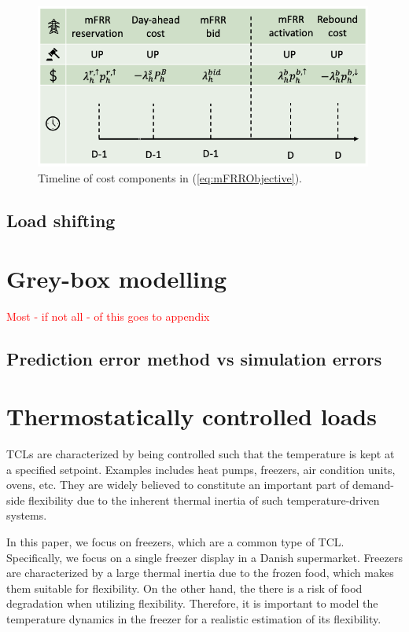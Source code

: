 \documentclass[11pt,a4paper]{article}
\begin{document}
\begin{figure}[H]
    \centering
    \includegraphics[width=0.99\textwidth]{figures/timeline_mfrr.png}
    \caption{Timeline of cost components in (\ref{eq:mFRRObjective}). }
    \label{fig:timeline_mfrr}
\end{figure}

\subsection{Load shifting}

\section{Grey-box modelling}

\textcolor{red}{Most - if not all - of this goes to appendix}
\subsection{Prediction error method vs simulation errors}


\section{Thermostatically controlled loads}

TCLs are characterized by being controlled such that the temperature is kept at a specified setpoint. Examples includes heat pumps, freezers, air condition units, ovens, etc. They are widely believed to constitute an important part of demand-side flexibility due to the inherent thermal inertia of such temperature-driven systems.

In this paper, we focus on freezers, which are a common type of TCL. Specifically, we focus on a single freezer display in a Danish supermarket. Freezers are characterized by a large thermal inertia due to the frozen food, which makes them suitable for flexibility. On the other hand, the there is a risk of food degradation when utilizing flexibility. Therefore, it is important to model the temperature dynamics in the freezer for a realistic estimation of its flexibility.
\end{document}
